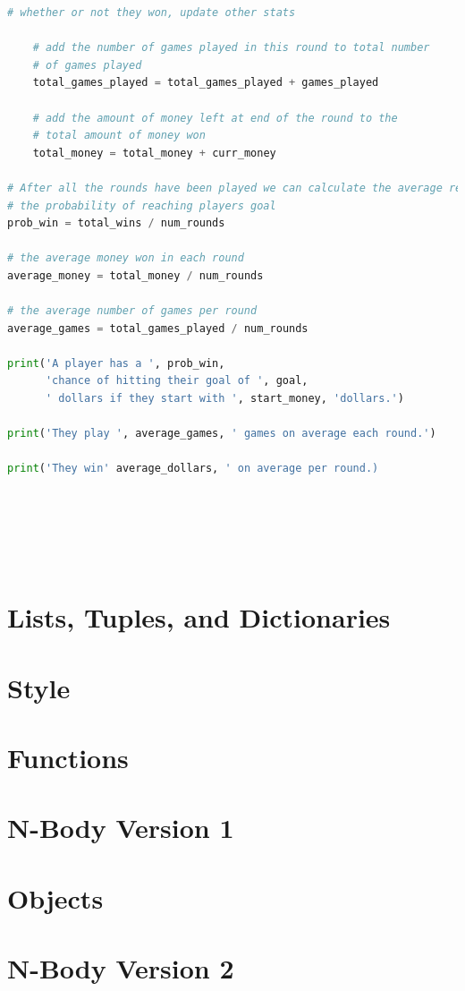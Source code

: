 \documentclass[]{article}
\begin{document}
\begin{lstlisting}[language=python]
    # whether or not they won, update other stats
    
    # add the number of games played in this round to total number
    # of games played
    total_games_played = total_games_played + games_played
    
    # add the amount of money left at end of the round to the
    # total amount of money won
    total_money = total_money + curr_money
    
# After all the rounds have been played we can calculate the average results
# the probability of reaching players goal
prob_win = total_wins / num_rounds

# the average money won in each round
average_money = total_money / num_rounds

# the average number of games per round
average_games = total_games_played / num_rounds

print('A player has a ', prob_win, 
      'chance of hitting their goal of ', goal, 
      ' dollars if they start with ', start_money, 'dollars.')

print('They play ', average_games, ' games on average each round.')

print('They win' average_dollars, ' on average per round.)


    

    

\end{lstlisting}




\section{ Lists, Tuples, and Dictionaries }
\label{sec:lists-tuples-dictionaries}
\section{ Style }
\section{ Functions }
\section{ N-Body Version 1 }
\section{ Objects }
\section{ N-Body Version 2 }
\end{document}
